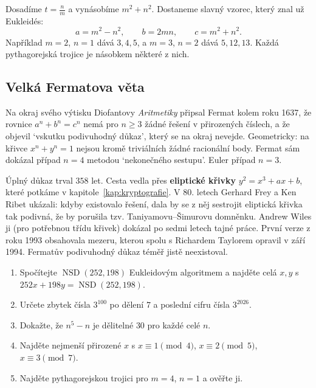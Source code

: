 Dosadíme $t = \frac{n}{m}$ a vynásobíme $m^2 + n^2$. Dostaneme slavný vzorec, který znal už Eukleidés:
\begin{equation*}
  a = m^2 - n^2,\qquad b = 2mn,\qquad c = m^2 + n^2.
\end{equation*}
Například $m = 2$, $n = 1$ dává $3, 4, 5$, a $m = 3$, $n = 2$ dává $5, 12, 13$. Každá pythagorejská trojice je násobkem některé z nich.

\subsection{Velká Fermatova věta}

Na okraj svého výtisku Diofantovy \textit{Aritmetiky} připsal Fermat kolem roku 1637, že rovnice $a^n + b^n = c^n$ nemá pro $n\geq 3$ žádné řešení v přirozených číslech, a že objevil `vskutku podivuhodný důkaz', který se na okraj nevejde. Geometricky: na křivce $x^n + y^n = 1$ nejsou kromě triviálních žádné racionální body. Fermat sám dokázal případ $n = 4$ metodou `nekonečného sestupu'. Euler případ $n = 3$.

Úplný důkaz trval $358$ let. Cesta vedla přes \textbf{eliptické křivky} $y^2 = x^3 + ax + b$, které potkáme v kapitole~\ref{kap:kryptografie}. V 80. letech Gerhard Frey a Ken Ribet ukázali: kdyby existovalo řešení, dala by se z něj sestrojit eliptická křivka tak podivná, že by porušila tzv. Taniyamovu--Šimurovu domněnku. Andrew Wiles ji (pro potřebnou třídu křivek) dokázal po sedmi letech tajné práce. První verze z roku 1993 obsahovala mezeru, kterou spolu s Richardem Taylorem opravil v září 1994. Fermatův podivuhodný důkaz téměř jistě neexistoval.

\begin{problem}
  \begin{enumerate}[label=(\alph*)]
    \item Spočítejte $\operatorname{NSD}(252, 198)$ Eukleidovým algoritmem a najděte celá $x, y$ s $252x + 198y = \operatorname{NSD}(252, 198)$.
    \item Určete zbytek čísla $3^{100}$ po dělení $7$ a poslední cifru čísla $3^{2026}$.
    \item Dokažte, že $n^5 - n$ je dělitelné $30$ pro každé celé $n$.
    \item Najděte nejmenší přirozené $x$ s $x\equiv 1\pmod 4$, $x\equiv 2\pmod 5$, $x\equiv 3\pmod 7$.
    \item Najděte pythagorejskou trojici pro $m = 4$, $n = 1$ a ověřte ji.
  \end{enumerate}
\end{problem}

